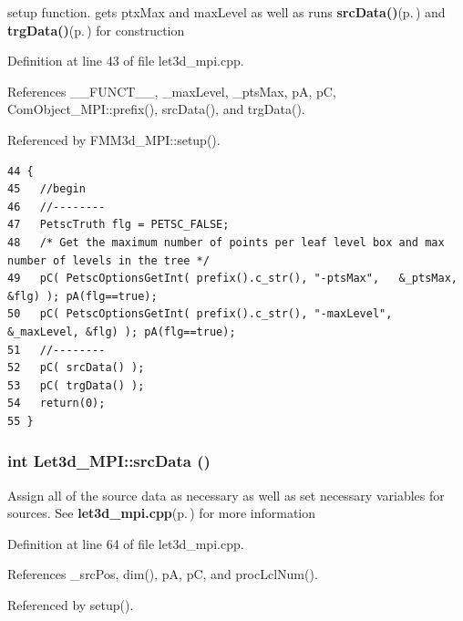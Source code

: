 setup function. gets ptx\-Max and max\-Level as well as runs {\bf src\-Data()}{\rm (p.\,\pageref{classLet3d__MPI_44ef9057a3adc0372c2569c172064dac_44ef9057a3adc0372c2569c172064dac})} and {\bf trg\-Data()}{\rm (p.\,\pageref{classLet3d__MPI_ca481263feff458d83769363d3ad85f7_ca481263feff458d83769363d3ad85f7})} for construction 

Definition at line 43 of file let3d\_\-mpi.cpp.

References \_\-\_\-FUNCT\_\-\_\-, \_\-max\-Level, \_\-pts\-Max, p\-A, p\-C, Com\-Object\_\-MPI::prefix(), src\-Data(), and trg\-Data().

Referenced by FMM3d\_\-MPI::setup().

\footnotesize\begin{verbatim}44 {
45   //begin
46   //--------
47   PetscTruth flg = PETSC_FALSE;
48   /* Get the maximum number of points per leaf level box and max number of levels in the tree */
49   pC( PetscOptionsGetInt( prefix().c_str(), "-ptsMax",   &_ptsMax,   &flg) ); pA(flg==true);
50   pC( PetscOptionsGetInt( prefix().c_str(), "-maxLevel", &_maxLevel, &flg) ); pA(flg==true);
51   //--------
52   pC( srcData() );  
53   pC( trgData() );  
54   return(0);
55 }
\end{verbatim}\normalsize 


\subsubsection{\setlength{\rightskip}{0pt plus 5cm}int Let3d\_\-MPI::src\-Data ()}\label{classLet3d__MPI_44ef9057a3adc0372c2569c172064dac_44ef9057a3adc0372c2569c172064dac}


Assign all of the source data as necessary as well as set necessary variables for sources. See {\bf let3d\_\-mpi.cpp}{\rm (p.\,\pageref{let3d__mpi_8cpp})} for more information 

Definition at line 64 of file let3d\_\-mpi.cpp.

References \_\-src\-Pos, dim(), p\-A, p\-C, and proc\-Lcl\-Num().

Referenced by setup().

